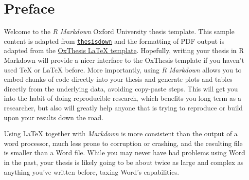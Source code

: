 \documentclass[a4paper, nobind]{templates/ociamthesis}
\begin{document}
\begin{romanpages}
\tableofcontents

\listoffigures
	\mtcaddchapter

\listoftables
  \mtcaddchapter


\end{romanpages}

\flushbottom

\hypertarget{preface}{%
\chapter*{Preface}\label{preface}}

\adjustmtc
{}

Welcome to the \emph{R Markdown} Oxford University thesis template.
This sample content is adapted from \href{https://github.com/ismayc/thesisdown}{\texttt{thesisdown}} and the formatting of PDF output is adapted from the \href{https://github.com/mcmanigle/OxThesis}{OxThesis LaTeX template}.
Hopefully, writing your thesis in R Markdown will provide a nicer interface to the OxThesis template if you haven't used TeX or LaTeX before.
More importantly, using \emph{R Markdown} allows you to embed chunks of code directly into your thesis and generate plots and tables directly from the underlying data, avoiding copy-paste steps.
This will get you into the habit of doing reproducible research, which benefits you long-term as a researcher, but also will greatly help anyone that is trying to reproduce or build upon your results down the road.

Using LaTeX together with \emph{Markdown} is more consistent than the output of a word processor, much less prone to corruption or crashing, and the resulting file is smaller than a Word file.
While you may never have had problems using Word in the past, your thesis is likely going to be about twice as large and complex as anything you've written before, taxing Word's capabilities.
\end{document}
